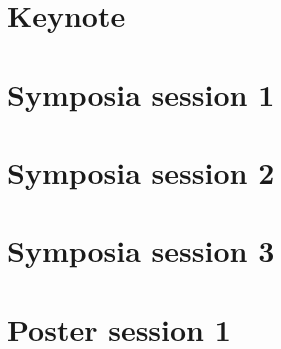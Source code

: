 

\vspace*{-1cm}
\section{Keynote}


\newpage

\section{Symposia session 1}


\newpage

\section{Symposia session 2}


\newpage

\section{Symposia session 3}


\newpage

\section{Poster session 1 }


\newpage